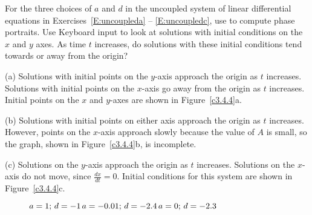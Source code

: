 \documentclass{ximera}
\begin{document}
\begin{exercise} \label{c3.4.4}
For the three choices of $a$ and $d$ in the uncoupled system of
linear differential equations in Exercises~\ref{E:uncoupleda} -- 
\ref{E:uncoupledc}, use {\pplane}
to compute phase portraits.  Use {\sf Keyboard input} to look at
solutions with initial conditions on the $x$ and $y$ axes.  As time
$t$ increases, do solutions with these initial conditions tend towards 
or away from the origin?

\begin{solution}

(a) Solutions with initial points on the $y$-axis approach the
origin as $t$ increases.  Solutions with initial points on the
$x$-axis go away from the origin as $t$ increases.  Initial points
on the $x$ and $y$-axes are shown in Figure~\ref{c3.4.4}a.

(b) Solutions with initial points on either axis approach the
origin as $t$ increases.  However, points on the $x$-axis
approach slowly because the value of $A$ is small, so the \Matlab
graph, shown in Figure~\ref{c3.4.4}b, is incomplete.

(c) Solutions on the $y$-axis approach the origin as $t$
increases.  Solutions on the $x$-axis do not move, since
$\frac{dx}{dt} = 0$.  Initial conditions for this system are shown
in Figure~\ref{c3.4.4}c.

\begin{figure}[htb]
                       \centerline{%
                       }
	\centerline{$a = 1\hbox{; }d = -1$\hspace{0.7in}$a = -0.01\hbox{; }d = -2.4$\hspace{0.7in}$a = 0\hbox{; }d = -2.3$}
\end{figure}

\end{solution}
\end{exercise}
\end{document}

